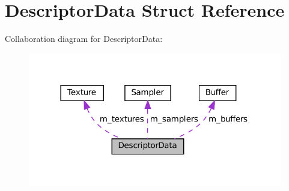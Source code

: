 \hypertarget{structDescriptorData}{}\section{Descriptor\+Data Struct Reference}
\label{structDescriptorData}


Collaboration diagram for Descriptor\+Data\+:\nopagebreak
\begin{figure}[H]
\begin{center}
\leavevmode
\includegraphics[width=314pt]{structDescriptorData__coll__graph}
\end{center}
\end{figure}
